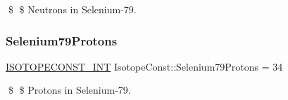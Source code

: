 \$ \$ Neutrons in Selenium-\/79. \mbox{\label{group___isotope_const-_selenium-_se79_ga235080e16eaad1d0ffcbd56a8988637a}} 
\subsubsection{\texorpdfstring{Selenium79\+Protons}{Selenium79Protons}}
{\footnotesize\ttfamily \mbox{\hyperlink{group___isotope_const-_macros_ga5f18360b3e99483a35c32d789e62621c}{I\+S\+O\+T\+O\+P\+E\+C\+O\+N\+S\+T\+\_\+\+I\+NT}} Isotope\+Const\+::\+Selenium79\+Protons = 34}

\$ \$ Protons in Selenium-\/79. 